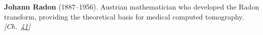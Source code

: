 \textbf{Johann Radon} (1887–1956). Austrian mathematician who developed the Radon transform, providing the theoretical basis for medical computed tomography. \emph{[Ch.~\hyperref[ch:hough]{41}]}

